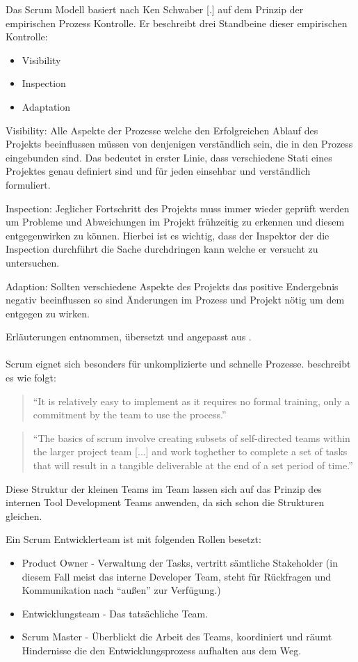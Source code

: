 \documentclass[pagesize, paper=a4, fontsize=12pt, titlepage=true, headings=small, headnosepline, abstractoff, liststotoc, nochapterprefix, plainheadsepline, twoside]{scrreprt}
\begin{document}
Das Scrum Modell basiert nach Ken Schwaber [.] auf dem Prinzip der empirischen Prozess Kontrolle. Er beschreibt drei Standbeine dieser empirischen Kontrolle:
\begin{itemize}
\item Visibility
\item Inspection
\item Adaptation
\end{itemize}

Visibility: Alle Aspekte der Prozesse welche den Erfolgreichen Ablauf des Projekts beeinflussen müssen von denjenigen verständlich sein, die in den Prozess eingebunden sind. Das bedeutet in erster Linie, dass verschiedene Stati eines Projektes genau definiert sind und für jeden einsehbar und verständlich formuliert. 

Inspection: Jeglicher Fortschritt des Projekts muss immer wieder geprüft werden um Probleme und Abweichungen im Projekt frühzeitig zu erkennen und diesem entgegenwirken zu können. Hierbei ist es wichtig, dass der Inspektor der die Inspection durchführt die Sache durchdringen kann welche er versucht zu untersuchen.

Adaption: Sollten verschiedene Aspekte des Projekts das positive Endergebnis negativ beeinflussen so sind Änderungen im Prozess und Projekt nötig um dem entgegen zu wirken.

Erläuterungen entnommen, übersetzt und angepasst aus \cite[S. 11]{Schwaber2004}.
\\
\\
Scrum eignet sich besonders für unkomplizierte und schnelle Prozesse. \autocite{Chandler2006} beschreibt es wie folgt:
\begin{quote}
“It is relatively easy to implement as it requires no formal training, only a commitment by the team to use the process.”
\cite[S. 45]{Chandler2006}
\end{quote}
\begin{quote}
“The basics of scrum involve creating subsets of self-directed teams within the larger project team [...] and work toghether to complete a set of tasks that will result in a tangible deliverable at the end of a set period of time.”
\cite[S. 45]{Chandler2006}
\end{quote}
Diese Struktur der kleinen Teams im Team lassen sich auf das Prinzip des internen Tool Development Teams anwenden, da sich schon die Strukturen gleichen.

Ein Scrum Entwicklerteam ist mit folgenden Rollen besetzt:
\begin{itemize}
\item Product Owner - Verwaltung der Tasks, vertritt sämtliche Stakeholder (in diesem Fall meist das interne Developer Team, steht für Rückfragen und Kommunikation nach “außen” zur Verfügung.)
\item Entwicklungsteam - Das tatsächliche Team.
\item Scrum Master - Überblickt die Arbeit des Teams, koordiniert und räumt Hindernisse die den Entwicklungsprozess aufhalten aus dem Weg.
\end{itemize}
\end{document}
